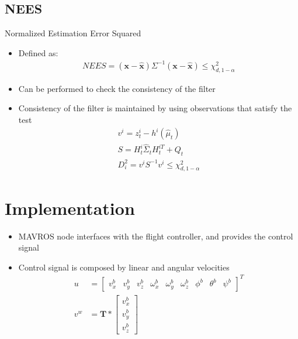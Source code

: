 \documentclass[serif]{beamer}
\begin{document}
    \subsection{NEES}
    \begin{frame}{Normalized Estimation Error Squared}
        \begin{itemize}
            \item{Defined as:
            \begin{align*}
                    NEES = \left(\bm{x} - \hat{\bm{x}}\right) \Sigma^{-1} \left(\bm{x} - \hat{\bm{x}}\right) \le \chi_{d, 1-\alpha}^2
            \end{align*}}
            \item{Can be performed to check the consistency of the filter}
            \item{Consistency of the filter is maintained by using observations that
satisfy the test
                \begin{align*}
                    v^i =  z_t^i - h^i \left( \hat\mu_t \right)\\
                    S = H_t^i \hat\Sigma_t H_t^{iT} + Q_t \\
                    D_i^2 = v^i S^{-1} v^i \le \chi_{d, 1-\alpha}^2
                    \label{eq:chapter2:nees:innov_test}
                \end{align*}
            }
        \end{itemize}
    \end{frame}

    \section{Implementation}
    \begin{frame}
        \begin{itemize}
            \item{MAVROS node interfaces with the flight controller, and provides the control signal}
            \item{Control signal is composed by linear and angular velocities
                \begin{align*}
                    u &= \begin{bmatrix} v_x^b & v_y^b & v_z^b & \omega_x^b & \omega_y^b & \omega_z^b & \phi^b & \theta^b & \psi^b \end{bmatrix}^T\\
                    v^w &= \textbf{T} * \begin{bmatrix} v_x^b \\ v_y^b \\ v_z^b \end{bmatrix}
                \end{align*}
            }
        \end{itemize}
    \end{frame}
\end{document}
